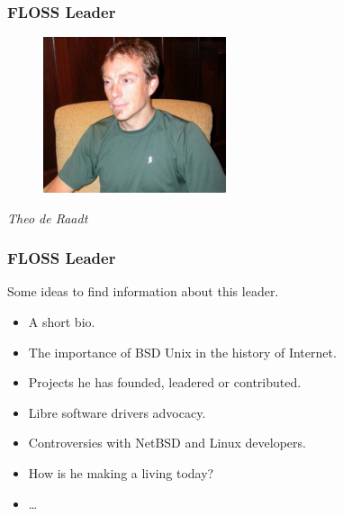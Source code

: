 \documentclass{beamer}
\begin{document}
\begin{frame}
\frametitle{FLOSS Leader}

\begin{figure}[h]
\begin{center}
  \includegraphics[height=1.80in]{figs/theo_de_raadt.jpg}
\end{center}
\end{figure}

\pause

\begin{center}
{\it Theo de Raadt}
\end{center}

\end{frame}

\begin{frame}
\frametitle{FLOSS Leader}

Some ideas to find information about this leader.
\pause
\begin{itemize}
\item A short bio.
\item The importance of BSD Unix in the history of Internet.
\item Projects he has founded, leadered or contributed.
\item Libre software drivers advocacy.
\item Controversies with NetBSD and Linux developers.
\item How is he making a living today?
\item \ldots
\end{itemize}

\end{frame}


\end{document}
